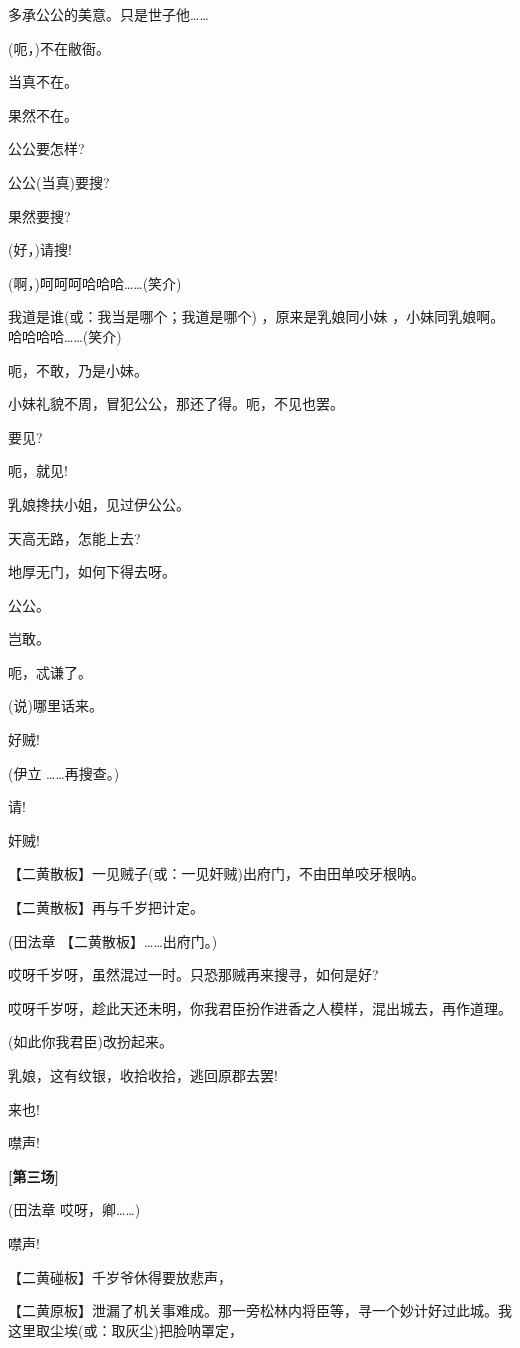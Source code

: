 多承公公的美意。只是世子他\ldots{}\ldots{}

(呃，)不在敝衙。

当真不在。

果然不在。

公公要怎样?

公公(当真)要搜?

果然要搜?

(好，)请搜!

(啊，)呵呵呵哈哈哈\ldots{}\ldots{}(笑介)

我道是谁(或：我当是哪个；我道是哪个) ，原来是乳娘同小妹
，小妹同乳娘啊。哈哈哈哈\ldots{}\ldots{}(笑介)

呃，不敢，乃是小妹。

小妹礼貌不周，冒犯公公，那还了得。呃，不见也罢。

要见?

呃，就见!

乳娘搀扶小姐，见过伊公公。

天高无路，怎能上去?

地厚无门，如何下得去呀。

公公。

岂敢。

呃，忒谦了。

(说)哪里话来。

好贼!

(伊立 \ldots{}\ldots{}再搜查。)

请!

奸贼!

【二黄散板】一见贼子(或：一见奸贼)出府门，不由田单咬牙根呐。

【二黄散板】再与千岁把计定。

(田法章 【二黄散板】\ldots{}\ldots{}出府门。)

哎呀千岁呀，虽然混过一时。只恐那贼再来搜寻，如何是好?

哎呀千岁呀，趁此天还未明，你我君臣扮作进香之人模样，混出城去，再作道理。

(如此你我君臣)改扮起来。

乳娘，这有纹银，收拾收拾，逃回原郡去罢!

来也!

噤声!

\textbf{{[}第三场{]}}

(田法章 哎呀，卿\ldots{}\ldots{})

噤声!

【二黄碰板】千岁爷休得要放悲声，

【二黄原板】泄漏了机关事难成。那一旁松林内将臣等，寻一个妙计好过此城。我这里取尘埃(或：取灰尘)把脸呐罩定，


